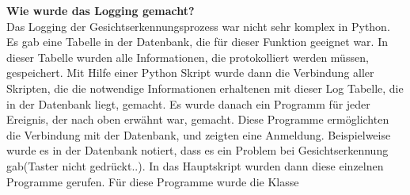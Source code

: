 \textbf{Wie wurde das Logging gemacht?}\\
Das Logging der Gesichtserkennungsprozess war nicht sehr komplex in Python. Es gab eine Tabelle in der Datenbank, die für dieser Funktion geeignet war. In dieser Tabelle wurden alle Informationen, die protokolliert werden müssen, gespeichert. Mit Hilfe einer Python Skript wurde dann die Verbindung aller Skripten, die die notwendige Informationen erhaltenen mit dieser Log Tabelle, die in der Datenbank liegt, gemacht. Es wurde danach ein Programm für jeder Ereignis, der nach oben erwähnt war, gemacht. Diese Programme ermöglichten die Verbindung mit der Datenbank, und zeigten eine Anmeldung. Beispielweise wurde es in der Datenbank notiert, dass es ein Problem bei Gesichtserkennung gab(Taster nicht gedrückt..). In das Hauptskript wurden dann diese einzelnen Programme gerufen. Für diese Programme wurde die Klasse %


